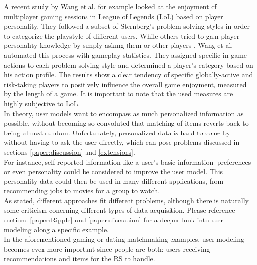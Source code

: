 \documentclass[nochapterpage,bigchapter,linedtoc,longdoc,colorback,accentcolor=tud3b,oneside]{tudreport}
\begin{document}
A recent study by Wang et al. \cite{wang2015thinking} for example looked at the enjoyment of multiplayer gaming sessions in League of Legends (LoL) based on player personality. They followed a subset of Sternberg's \cite{sternberg1999thinking} problem-solving styles in order to categorize the playstyle of different users. While others tried to gain player personality knowledge by simply asking them \cite{riegelsberger2007personality} or other players \cite{patrick2011system}, Wang et al. automated this process with gameplay statistics. They assigned specific in-game actions to each problem solving style and determined a player's category based on his action profile. The results show a clear tendency of specific globally-active and risk-taking players to positively influence the overall game enjoyment, measured by the length of a game. It is important to note that the used measures are highly subjective to LoL.\\
In theory, user models want to encompass as much personalized information as possible, without becoming so convoluted that matching of items reverts back to being almost random. \cite{olakanmi2017group} Unfortunately, personalized data is hard to come by without having to ask the user directly, which can pose problems discussed in sections \ref{paper:discussion} and \ref{extensions}.\\
For instance, self-reported information like a user's basic information, preferences or even personality could be considered to improve the user model. \cite{nunes2012personality} This personality data could then be used in many different applications, from recommending jobs to movies for a group to watch. \cite{costa1995persons, recio2009personality}\\
As stated, different approaches fit different problems, although there is naturally some criticism conerning different types of data acquisition. Please reference sections \ref{paper:Ripple} and \ref{paper:discussion} for a deeper look into user modeling along a specific example.\\
In the aforementioned gaming or dating matchmaking examples, user modeling becomes even more important since people are both: users receiving recommendations and items for the RS to handle.\\
\end{document}
